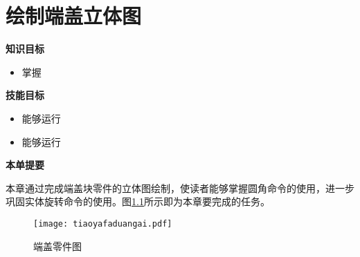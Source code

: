 \chapter{绘制端盖立体图}

{\bfseries 知识目标}
\begin{itemize}
\item 掌握
\end{itemize}

{\bfseries 技能目标}
\begin{itemize}
\item 能够运行
\item 能够运行
\end{itemize}

{\bfseries 本单提要}

本章通过完成端盖块零件的立体图绘制，使读者能够掌握圆角命令的使用，进一步巩固实体旋转命令的使用。图\ref{fig:tiaoyafaduangai}所示即为本章要完成的任务。
\noindent
\begin{figure}[htbp]
\centering
\texttt{[image: tiaoyafaduangai.pdf]}
\caption{端盖零件图}\label{fig:tiaoyafaduangai}
\end{figure}
\endinput